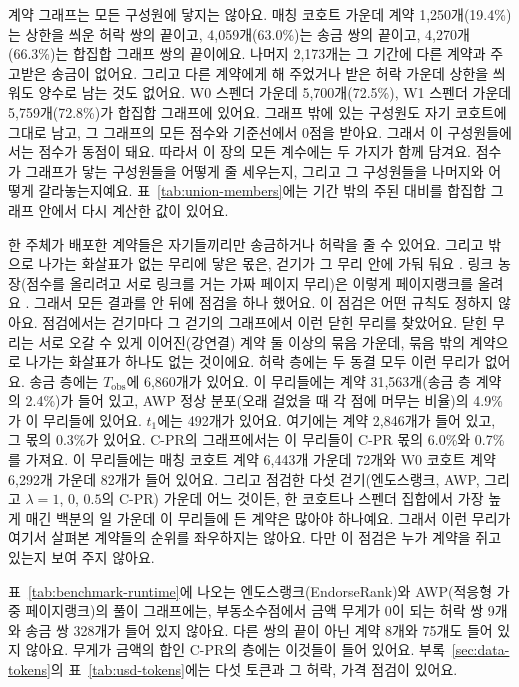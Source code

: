 

계약 그래프는 모든 구성원에 닿지는 않아요. 매칭 코호트 가운데 계약 1,250개(19.4\%)는 상한을 씌운 허락 쌍의 끝이고, 4,059개(63.0\%)는 송금 쌍의 끝이고, 4,270개(66.3\%)는 합집합 그래프 쌍의 끝이에요. 나머지 2,173개는 그 기간에 다른 계약과 주고받은 송금이 없어요. 그리고 다른 계약에게 해 주었거나 받은 허락 가운데 상한을 씌워도 양수로 남는 것도 없어요. W0 스펜더 가운데 5,700개(72.5\%), W1 스펜더 가운데 5,759개(72.8\%)가 합집합 그래프에 있어요. 그래프 밖에 있는 구성원도 자기 코호트에 그대로 남고, 그 그래프의 모든 점수와 기준선에서 0점을 받아요. 그래서 이 구성원들에서는 점수가 동점이 돼요. 따라서 이 장의 모든 계수에는 두 가지가 함께 담겨요. 점수가 그래프가 닿는 구성원들을 어떻게 줄 세우는지, 그리고 그 구성원들을 나머지와 어떻게 갈라놓는지예요. 표~\ref{tab:union-members}에는 기간 밖의 주된 대비를 합집합 그래프 안에서 다시 계산한 값이 있어요.

한 주체가 배포한 계약들은 자기들끼리만 송금하거나 허락을 줄 수 있어요. 그리고 밖으로 나가는 화살표가 없는 무리에 닿은 몫은, 걷기가 그 무리 안에 가둬 둬요 \parencite{langville2006pagerank}. 링크 농장(점수를 올리려고 서로 링크를 거는 가짜 페이지 무리)은 이렇게 페이지랭크를 올려요 \parencite{gyongyi2005alliances}. 그래서 모든 결과를 안 뒤에 점검을 하나 했어요. 이 점검은 어떤 규칙도 정하지 않아요. 점검에서는 걷기마다 그 걷기의 그래프에서 이런 닫힌 무리를 찾았어요. 닫힌 무리는 서로 오갈 수 있게 이어진(강연결) 계약 둘 이상의 묶음 가운데, 묶음 밖의 계약으로 나가는 화살표가 하나도 없는 것이에요. 허락 층에는 두 동결 모두 이런 무리가 없어요. 송금 층에는 $T_{\mathrm{obs}}$에 6,860개가 있어요. 이 무리들에는 계약 31,563개(송금 층 계약의 2.4\%)가 들어 있고, AWP 정상 분포(오래 걸었을 때 각 점에 머무는 비율)의 4.9\%가 이 무리들에 있어요. $t_1$에는 492개가 있어요. 여기에는 계약 2,846개가 들어 있고, 그 몫의 0.3\%가 있어요. \mbox{C-PR}의 그래프에서는 이 무리들이 \mbox{C-PR} 몫의 6.0\%와 0.7\%를 가져요. 이 무리들에는 매칭 코호트 계약 6,443개 가운데 72개와 W0 코호트 계약 6,292개 가운데 82개가 들어 있어요. 그리고 점검한 다섯 걷기(엔도스랭크, AWP, 그리고 $\lambda=1$, $0$, $0.5$의 \mbox{C-PR}) 가운데 어느 것이든, 한 코호트나 스펜더 집합에서 가장 높게 매긴 백분의 일 가운데 이 무리들에 든 계약은 많아야 하나예요. 그래서 이런 무리가 여기서 살펴본 계약들의 순위를 좌우하지는 않아요. 다만 이 점검은 누가 계약을 쥐고 있는지 보여 주지 않아요.

표~\ref{tab:benchmark-runtime}에 나오는 엔도스랭크(EndorseRank)와 AWP(적응형 가중 페이지랭크)의 풀이 그래프에는, 부동소수점에서 금액 무게가 0이 되는 허락 쌍 9개와 송금 쌍 328개가 들어 있지 않아요. 다른 쌍의 끝이 아닌 계약 8개와 75개도 들어 있지 않아요. 무게가 금액의 합인 \mbox{C-PR}의 층에는 이것들이 들어 있어요. 부록~\ref{sec:data-tokens}의 표~\ref{tab:usd-tokens}에는 다섯 토큰과 그 허락, 가격 점검이 있어요.

